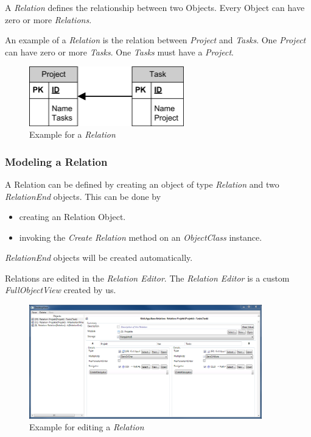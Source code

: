 A \emph{Relation} defines the relationship between two Objects. Every Object can have zero or more \emph{Relations}.
\par
An example of a \emph{Relation} is the relation between \emph{Project} and \emph{Tasks}. One \emph{Project} can have zero or more \emph{Tasks}. One \emph{Tasks} must have a \emph{Project}.

\begin{figure}[ht]
	\begin{center}
		\includegraphics[width=0.6\textwidth]{images/Rel_1_n_Project_Tasks.png}
		\caption{Example for a \emph{Relation}}
		\label{example_for_relation}
	\end{center}
\end{figure}


\subsubsection{Modeling a Relation}
A Relation can be defined by creating an object of type \emph{Relation} and two \emph{RelationEnd} objects. This can be done by
\begin{itemize}
	\item creating an Relation Object. 
	\item invoking the \emph{Create Relation} method on an \emph{ObjectClass} instance.
\end{itemize}

\emph{RelationEnd} objects will be created automatically.

\par
Relations are edited in the \emph{Relation Editor}. The \emph{Relation Editor} is a custom \emph{FullObjectView} created by us.

\begin{figure}[ht]
	\begin{center}
		\includegraphics[width=0.9\textwidth]{images/ScreenShot_Rel_Project_Task.png}
		\caption{Example for editing a \emph{Relation}}
		\label{example_for_editing_relation}
	\end{center}
\end{figure}

